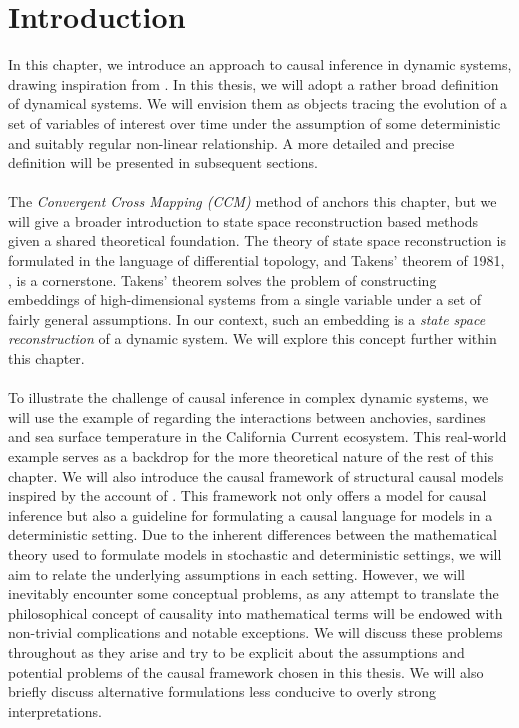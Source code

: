 \documentclass[11pt, a4paper]{memoir}
\theoremstyle{break}
\theoremstyle{break}
\theoremstyle{nonumberplain}
\begin{document}
\section*{Introduction}
In this chapter, we introduce an approach to causal inference in dynamic systems, drawing inspiration from \cite{Sugihara}. In this thesis, we will adopt a rather broad definition of dynamical systems. We will envision them as objects tracing the evolution of a set of variables of interest over time under the assumption of some deterministic and suitably regular non-linear relationship. A more detailed and precise definition will be presented in subsequent sections.\\\\ The \textit{Convergent Cross Mapping (CCM)} method of \cite{Sugihara} anchors this chapter, but we will give a broader introduction to state space reconstruction based methods given a shared theoretical foundation. The theory of state space reconstruction is formulated in the language of differential topology, and Takens' theorem of 1981, \cite{Takens}, is a cornerstone. Takens' theorem solves the problem of constructing embeddings of high-dimensional systems from a single variable under a set of fairly general assumptions. In our context, such an embedding is a \textit{state space reconstruction} of a dynamic system. We will explore this concept further within this chapter.\\\\
To illustrate the challenge of causal inference in complex dynamic systems, we will use the example of \cite{Sugihara} regarding the interactions between anchovies, sardines and sea surface temperature in the California Current ecosystem. This real-world example serves as a backdrop for the more theoretical nature of the rest of this chapter. We will also introduce the causal framework of structural causal models inspired by the account of \cite{Peters}. This framework not only offers a model for causal inference but also a guideline for formulating a causal language for models in a deterministic setting. Due to the inherent differences between the mathematical theory used to formulate models in stochastic and deterministic settings, we will aim to relate the underlying assumptions in each setting. However, we will inevitably encounter some conceptual problems, as any attempt to translate the philosophical concept of causality into mathematical terms will be endowed with non-trivial complications and notable exceptions. We will discuss these problems throughout as they arise and try to be explicit about the assumptions and potential problems of the causal framework chosen in this thesis. We will also briefly discuss alternative formulations less conducive to overly strong interpretations.\\\\
\end{document}
